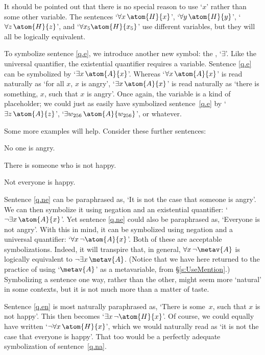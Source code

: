 It should be pointed out that there is no special reason to use `$x$' rather than some other variable. The sentences `$\forall x\, \atom{H}{x}$', `$\forall y\, \atom{H}{y}$', `$\forall z\, \atom{H}{z}$', and `$\forall x_5 \atom{H}{x_5}$' use different variables, but they will all be logically equivalent.

To symbolize sentence \ref{q.e}, we introduce another new symbol: the , `$\exists$'. Like the universal quantifier, the existential quantifier requires a variable. Sentence \ref{q.e} can be symbolized by `$\exists x\,\atom{A}{x}$'. Whereas `$\forall x\,\atom{A}{x}$' is read naturally as `for all $x$, $x$ is angry', `$\exists x\,\atom{A}{x}$' is read naturally as `there is something, $x$, such that $x$ is angry'. Once again, the variable is a kind of placeholder; we could just as easily have symbolized sentence~\ref{q.e} by `$\exists z\, \atom{A}{z}$', `$\exists w_{256}\, \atom{A}{w_{256}}$', or whatever.


Some more examples will help. Consider these further sentences:
	\begin{earg}
		\item[\ex{q.ne}] No one is angry.
		\item[\ex{q.en}] There is someone who is not happy.
		\item[\ex{q.na}] Not everyone is happy.
	\end{earg}
Sentence \ref{q.ne} can be paraphrased as, `It is not the case that someone is angry'. We can then symbolize it using negation and an existential quantifier: `$\enot \exists x\,\atom{A}{x}$'. Yet sentence \ref{q.ne} could also be paraphrased as, `Everyone is not angry'. With this in mind, it can be symbolized using negation and a universal quantifier: `$\forall x\, \enot \atom{A}{x}$'. Both of these are acceptable symbolizations.  Indeed, it will transpire that, in general, $\forall x\, \enot\metav{A}$ is logically equivalent to $\enot\exists x\,\metav{A}$. (Notice that we have here returned to the practice of using `$\metav{A}$' as a metavariable, from \S\ref{s:UseMention}.) Symbolizing a sentence one way, rather than the other, might seem more `natural' in some contexts, but it is not much more than a matter of taste.

Sentence \ref{q.en} is most naturally paraphrased as, `There is some~$x$, such that $x$ is not happy'. This then becomes `$\exists x\, \enot \atom{H}{x}$'. Of course, we could equally have written `$\enot\forall x\,\atom{H}{x}$', which we would naturally read as `it is not the case that everyone is happy'. That too would be a perfectly adequate symbolization of sentence~\ref{q.na}.


